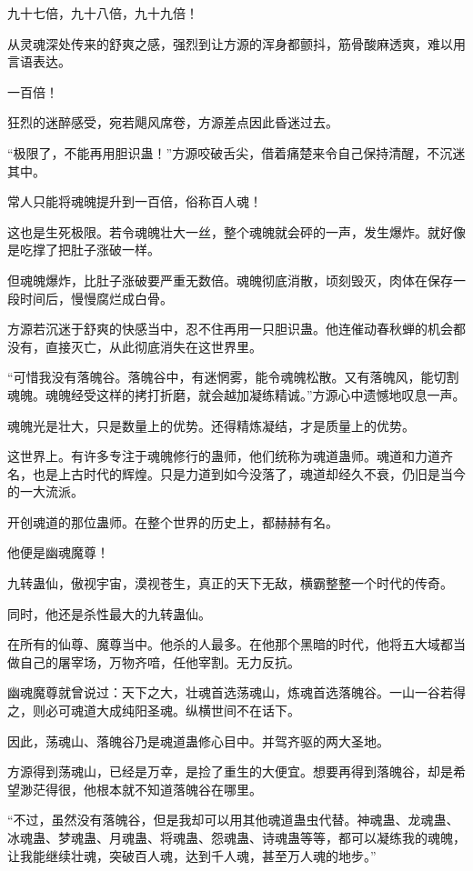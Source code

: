 \begin{this_body}
九十七倍，九十八倍，九十九倍！

从灵魂深处传来的舒爽之感，强烈到让方源的浑身都颤抖，筋骨酸麻透爽，难以用言语表达。

一百倍！

狂烈的迷醉感受，宛若飓风席卷，方源差点因此昏迷过去。

“极限了，不能再用胆识蛊！”方源咬破舌尖，借着痛楚来令自己保持清醒，不沉迷其中。

常人只能将魂魄提升到一百倍，俗称百人魂！

这也是生死极限。若令魂魄壮大一丝，整个魂魄就会砰的一声，发生爆炸。就好像是吃撑了把肚子涨破一样。

但魂魄爆炸，比肚子涨破要严重无数倍。魂魄彻底消散，顷刻毁灭，肉体在保存一段时间后，慢慢腐烂成白骨。

方源若沉迷于舒爽的快感当中，忍不住再用一只胆识蛊。他连催动春秋蝉的机会都没有，直接灭亡，从此彻底消失在这世界里。

“可惜我没有落魄谷。落魄谷中，有迷惘雾，能令魂魄松散。又有落魄风，能切割魂魄。魂魄经受这样的拷打折磨，就会越加凝练精诚。”方源心中遗憾地叹息一声。

魂魄光是壮大，只是数量上的优势。还得精炼凝结，才是质量上的优势。

这世界上。有许多专注于魂魄修行的蛊师，他们统称为魂道蛊师。魂道和力道齐名，也是上古时代的辉煌。只是力道到如今没落了，魂道却经久不衰，仍旧是当今的一大流派。

开创魂道的那位蛊师。在整个世界的历史上，都赫赫有名。

他便是幽魂魔尊！

九转蛊仙，傲视宇宙，漠视苍生，真正的天下无敌，横霸整整一个时代的传奇。

同时，他还是杀性最大的九转蛊仙。

在所有的仙尊、魔尊当中。他杀的人最多。在他那个黑暗的时代，他将五大域都当做自己的屠宰场，万物齐喑，任他宰割。无力反抗。

幽魂魔尊就曾说过：天下之大，壮魂首选荡魂山，炼魂首选落魄谷。一山一谷若得之，则必可魂道大成纯阳圣魂。纵横世间不在话下。

因此，荡魂山、落魄谷乃是魂道蛊修心目中。并驾齐驱的两大圣地。

方源得到荡魂山，已经是万幸，是捡了重生的大便宜。想要再得到落魄谷，却是希望渺茫得很，他根本就不知道落魄谷在哪里。

“不过，虽然没有落魄谷，但是我却可以用其他魂道蛊虫代替。神魂蛊、龙魂蛊、冰魂蛊、梦魂蛊、月魂蛊、将魂蛊、怨魂蛊、诗魂蛊等等，都可以凝练我的魂魄，让我能继续壮魂，突破百人魂，达到千人魂，甚至万人魂的地步。”


\end{this_body}
